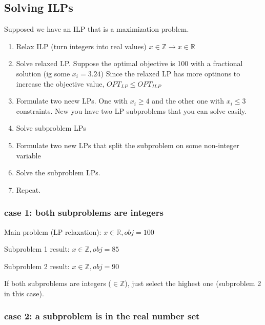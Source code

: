 \documentclass[11pt]{article}
\begin{document}
\subsection{Solving ILPs}
\label{sec:orga2be5e2}

Supposed we have an ILP that is a maximization problem.

\begin{enumerate}
\item Relax ILP (turn integers into real values) \(x \in \mathbb{Z} \rightarrow x \in \mathbb{R}\)

\item Solve relaxed LP. Suppose the optimal objective is 100 with a fractional solution (ig some \(x_i = 3.24\))
Since the relaxed LP has more optinons to increase the objective value, \(OPT_{LP} \leq OPT_{ILP}\)

\item Formulate two neew LPs. One with \(x_i \geq 4\) and the other one with \(x_i \leq 3\) constraints. New you have two LP subproblems that you can solve easily.

\item Solve subproblem LPs

\item Formulate two new LPs that split the subproblem on some non-integer variable

\item Solve the subproblem LPs.

\item Repeat.
\end{enumerate}

\subsubsection{case 1: both subproblems are integers}
\label{sec:org68d9625}

Main problem (LP relaxation): \(x \in \mathbb{R}, obj = 100\)

Subproblem 1 result: \(x \in \mathbb{Z}, obj = 85\)

Subproblem 2 result: \(x \in \mathbb{Z}, obj = 90\)

If both subproblems are integers (\(\in \mathbb{Z}\)), just select the highest one (subproblem 2 in this case).

\subsubsection{case 2: a subproblem is in the real number set}
\label{sec:org04879bf}
\end{document}
